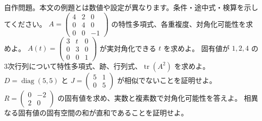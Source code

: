 \documentclass[11pt]{article}
\begin{document}
自作問題。本文の例題とは数値や設定が異なります。条件・途中式・検算を示してください。
\problem[重根と固有空間]
$A=\begin{pmatrix}4&2&0\\0&4&0\\0&0&-1\end{pmatrix}$ の特性多項式、各重複度、対角化可能性を求めよ。
\workspace{45mm}
\problem[パラメータと対角化]
$A(t)=\begin{pmatrix}3&t&0\\0&3&0\\0&0&1\end{pmatrix}$ が実対角化できる $t$ を求めよ。
\workspace{45mm}
\newpage
\problem[3次の係数]
固有値が $1,2,4$ の3次行列について特性多項式、跡、行列式、$\operatorname{tr}(A^2)$ を求めよ。
\workspace{45mm}
\problem[同じ多項式でも相似でない]
$D=\operatorname{diag}(5,5)$ と $J=\begin{pmatrix}5&1\\0&5\end{pmatrix}$ が相似でないことを証明せよ。
\workspace{45mm}
\newpage
\problem[体による違い]
$R=\begin{pmatrix}0&-2\\2&0\end{pmatrix}$ の固有値を求め、実数と複素数で対角化可能性を答えよ。
\workspace{45mm}
\problem[固有空間の独立性]
相異なる固有値の固有空間の和が直和であることを証明せよ。
\workspace{45mm}
\end{document}
